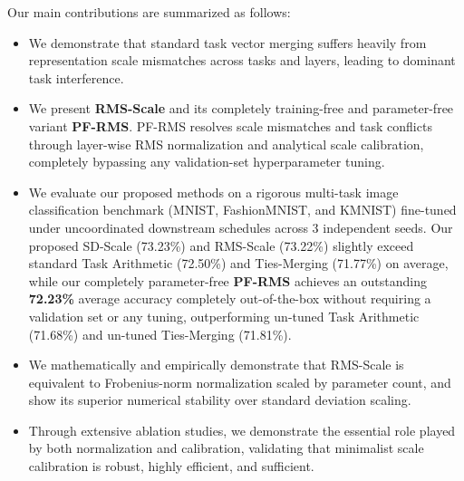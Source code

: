 Our main contributions are summarized as follows:
\begin{itemize}
    \item We demonstrate that standard task vector merging suffers heavily from representation scale mismatches across tasks and layers, leading to dominant task interference.
    \item We present \textbf{RMS-Scale} and its completely training-free and parameter-free variant \textbf{PF-RMS}. PF-RMS resolves scale mismatches and task conflicts through layer-wise RMS normalization and analytical scale calibration, completely bypassing any validation-set hyperparameter tuning.
    \item We evaluate our proposed methods on a rigorous multi-task image classification benchmark (MNIST, FashionMNIST, and KMNIST) fine-tuned under uncoordinated downstream schedules across 3 independent seeds. Our proposed SD-Scale (73.23\%) and RMS-Scale (73.22\%) slightly exceed standard Task Arithmetic (72.50\%) and Ties-Merging (71.77\%) on average, while our completely parameter-free \textbf{PF-RMS} achieves an outstanding \textbf{72.23\%} average accuracy completely out-of-the-box without requiring a validation set or any tuning, outperforming un-tuned Task Arithmetic (71.68\%) and un-tuned Ties-Merging (71.81\%).
    \item We mathematically and empirically demonstrate that RMS-Scale is equivalent to Frobenius-norm normalization scaled by parameter count, and show its superior numerical stability over standard deviation scaling.
    \item Through extensive ablation studies, we demonstrate the essential role played by both normalization and calibration, validating that minimalist scale calibration is robust, highly efficient, and sufficient.
\end{itemize}
